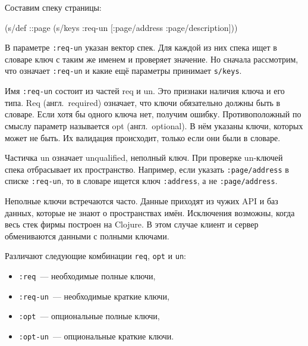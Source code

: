 Составим спеку страницы:

\begin{english}
  \begin{clojure}
(s/def ::page
  (s/keys :req-un [:page/address
                   :page/description]))
  \end{clojure}
\end{english}


В параметре \verb|:req-un| указан вектор спек. Для каждой из них спека ищет в
словаре ключ с таким же именем и проверяет значение. Но сначала рассмотрим, что
означает \verb|:req-un| и какие ещё параметры принимает \verb|s/keys|.

Имя \verb|:req-un| состоит из частей req и un. Это признаки наличия
ключа и его типа. Req (англ.~required) означает, что ключи обязательно должны
быть в словаре. Если хотя бы одного ключа нет, получим ошибку. Противоположный
по смыслу параметр называется opt (англ.~optional). В нём указаны ключи,
которых может не быть. Их валидация происходит, только если они были в словаре.


Частичка un означает unqualified, неполный ключ. При проверке un-ключей
спека отбрасывает их пространство. Например, если указать \verb|:page/address|
в списке \verb|:req-un|, то в словаре ищется ключ \verb|:address|, а не
\verb|:page/address|.

Неполные ключи встречаются часто. Данные приходят из чужих API и баз данных,
которые не знают о пространствах имён. Исключения возможны, когда весь стек
фирмы построен на Clojure. В этом случае клиент и сервер обмениваются данными с
полными ключами.

Различают следующие комбинации \verb|req|, \verb|opt| и \verb|un|:

\begin{itemize}

\item
  \verb|:req|~--- необходимые полные ключи,

\item
  \verb|:req-un|~--- необходимые краткие ключи,


\item
  \verb|:opt|~--- опциональные полные ключи,


\item
  \verb|:opt-un|~--- опциональные краткие ключи.

\end{itemize}

